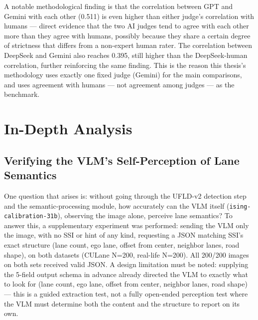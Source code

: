 \documentclass[12pt,a4paper]{report}
\begin{document}
A notable methodological finding is that the correlation between GPT and Gemini with each other (0.511) is even higher than either judge's correlation with humans --- direct evidence that the two AI judges tend to agree with each other more than they agree with humans, possibly because they share a certain degree of strictness that differs from a non-expert human rater. The correlation between DeepSeek and Gemini also reaches 0.395, still higher than the DeepSeek-human correlation, further reinforcing the same finding. This is the reason this thesis's methodology uses exactly one fixed judge (Gemini) for the main comparisons, and uses agreement with humans --- not agreement among judges --- as the benchmark.

\section{In-Depth Analysis}

\subsection{Verifying the VLM's Self-Perception of Lane Semantics}

One question that arises is: without going through the UFLD-v2 detection step and the semantic-processing module, how accurately can the VLM itself (\texttt{ising-calibration-31b}), observing the image alone, perceive lane semantics? To answer this, a supplementary experiment was performed: sending the VLM only the image, with no SSI or hint of any kind, requesting a JSON matching SSI's exact structure (lane count, ego lane, offset from center, neighbor lanes, road shape), on both datasets (CULane N=200, real-life N=200). All 200/200 images on both sets received valid JSON. A design limitation must be noted: supplying the 5-field output schema in advance already directed the VLM to exactly what to look for (lane count, ego lane, offset from center, neighbor lanes, road shape) --- this is a guided extraction test, not a fully open-ended perception test where the VLM must determine both the content and the structure to report on its own.
\end{document}
